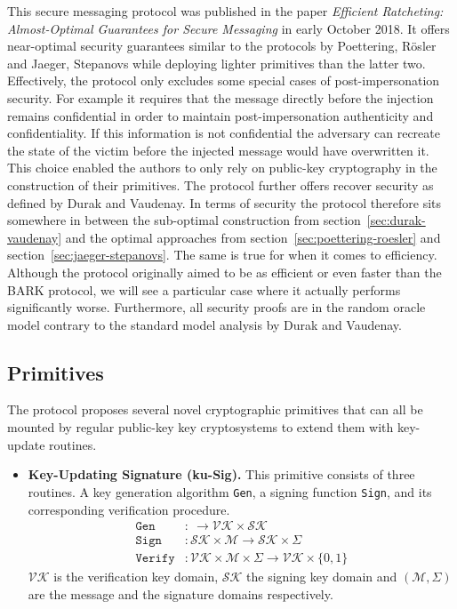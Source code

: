\documentclass[11pt,a4paper,twoside,openright,bibliography=totoc]{scrbook}
\begin{document}
This secure messaging protocol was published in the paper
\textit{Efficient Ratcheting: Almost-Optimal Guarantees for Secure Messaging}
in early October 2018. It offers near-optimal security guarantees similar
to the protocols by Poettering, Rösler and Jaeger, Stepanovs while
deploying lighter primitives than the latter two. Effectively, the protocol
only excludes some special cases of post-impersonation security.
For example it requires that the message directly before
the injection remains confidential in order to maintain
post-impersonation authenticity and confidentiality. If this
information is not confidential the adversary can
recreate the state of the victim before the injected message would have overwritten it.
This choice enabled the authors to only rely on public-key cryptography in
the construction of their primitives. The protocol further
offers recover security as defined by Durak and Vaudenay.
In terms of security the protocol therefore sits somewhere in
between the sub-optimal construction from section~\ref{sec:durak-vaudenay}
and the optimal approaches from section~\ref{sec:poettering-roesler}
and section~\ref{sec:jaeger-stepanovs}. The same is true
for when it comes to efficiency. Although the protocol originally aimed
to be as efficient or even faster than the BARK protocol,
we will see a particular case where it actually performs significantly worse.
Furthermore, all security proofs are in the random oracle model contrary
to the standard model analysis by Durak and Vaudenay.

\subsection{Primitives}
\label{sec:primitives-3}

The protocol proposes several novel cryptographic primitives that can all be
mounted by regular public-key key cryptosystems to extend them
with key-update routines.
\begin{itemize}
\item \textbf{Key-Updating Signature (ku-Sig).} This primitive consists of
  three routines. A key generation algorithm \texttt{Gen}, a signing function
  \texttt{Sign}, and its corresponding verification procedure.
  \begin{align*}
    \texttt{Gen} & : \ \rightarrow \mathcal{VK} \times \mathcal{SK} \\
    \texttt{Sign} & : \mathcal{SK} \times \mathcal{M} \rightarrow \mathcal{SK} \times \Sigma \\
    \texttt{Verify} & : \mathcal{VK} \times \mathcal{M} \times \Sigma
             \rightarrow \mathcal{VK} \times \{0,1\}
  \end{align*}
  $\mathcal{VK}$ is the verification key domain, $\mathcal{SK}$ the signing
  key domain and $(\mathcal{M},\Sigma)$ are the message and the signature domains
  respectively.
\end{itemize}
\end{document}
